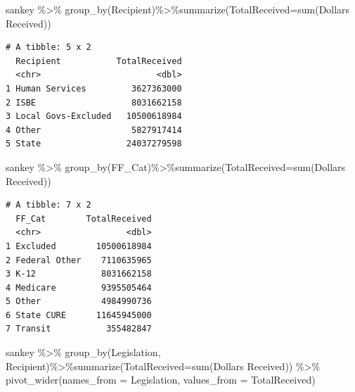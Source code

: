 \documentclass[
  letterpaper,
  DIV=11,
  numbers=noendperiod]{scrreport}
\newenvironment{Shaded}{\begin{snugshade}}{\end{snugshade}}
\newcommand{\AttributeTok}[1]{\textcolor[rgb]{0.40,0.45,0.13}{#1}}
\newcommand{\FunctionTok}[1]{\textcolor[rgb]{0.28,0.35,0.67}{#1}}
\newcommand{\NormalTok}[1]{\textcolor[rgb]{0.00,0.23,0.31}{#1}}
\newcommand{\SpecialCharTok}[1]{\textcolor[rgb]{0.37,0.37,0.37}{#1}}
\newcommand{\StringTok}[1]{\textcolor[rgb]{0.13,0.47,0.30}{#1}}
\begin{document}
\begin{Shaded}
\begin{Highlighting}[]
\NormalTok{sankey }\SpecialCharTok{\%\textgreater{}\%} \FunctionTok{group\_by}\NormalTok{(Recipient)}\SpecialCharTok{\%\textgreater{}\%}\FunctionTok{summarize}\NormalTok{(}\AttributeTok{TotalReceived=}\FunctionTok{sum}\NormalTok{(}\StringTok{\textasciigrave{}}\AttributeTok{Dollars Received}\StringTok{\textasciigrave{}}\NormalTok{))}
\end{Highlighting}
\end{Shaded}

\begin{verbatim}
# A tibble: 5 x 2
  Recipient           TotalReceived
  <chr>                       <dbl>
1 Human Services         3627363000
2 ISBE                   8031662158
3 Local Govs-Excluded   10500618984
4 Other                  5827917414
5 State                 24037279598
\end{verbatim}

\begin{Shaded}
\begin{Highlighting}[]
\NormalTok{sankey }\SpecialCharTok{\%\textgreater{}\%} \FunctionTok{group\_by}\NormalTok{(FF\_Cat)}\SpecialCharTok{\%\textgreater{}\%}\FunctionTok{summarize}\NormalTok{(}\AttributeTok{TotalReceived=}\FunctionTok{sum}\NormalTok{(}\StringTok{\textasciigrave{}}\AttributeTok{Dollars Received}\StringTok{\textasciigrave{}}\NormalTok{))}
\end{Highlighting}
\end{Shaded}

\begin{verbatim}
# A tibble: 7 x 2
  FF_Cat        TotalReceived
  <chr>                 <dbl>
1 Excluded        10500618984
2 Federal Other    7110635965
3 K-12             8031662158
4 Medicare         9395505464
5 Other            4984990736
6 State CURE      11645945000
7 Transit           355482847
\end{verbatim}

\begin{Shaded}
\begin{Highlighting}[]
\NormalTok{sankey }\SpecialCharTok{\%\textgreater{}\%} \FunctionTok{group\_by}\NormalTok{(Legislation, Recipient)}\SpecialCharTok{\%\textgreater{}\%}\FunctionTok{summarize}\NormalTok{(}\AttributeTok{TotalReceived=}\FunctionTok{sum}\NormalTok{(}\StringTok{\textasciigrave{}}\AttributeTok{Dollars Received}\StringTok{\textasciigrave{}}\NormalTok{)) }\SpecialCharTok{\%\textgreater{}\%} \FunctionTok{pivot\_wider}\NormalTok{(}\AttributeTok{names\_from =}\NormalTok{ Legislation, }\AttributeTok{values\_from =}\NormalTok{ TotalReceived)}
\end{Highlighting}
\end{Shaded}
\end{document}
